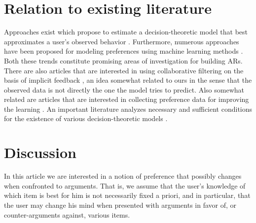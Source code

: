 \documentclass[french, english]{da2pl2018}
\begin{document}

\section{Relation to existing literature}
\label{sec:litt}
Approaches exist which propose to estimate a decision-theoretic model that best approximates a user’s observed behavior \citep{greco_trends_2010, sobrie_learning_2018}. 
Furthermore, numerous approaches have been proposed for modeling preferences using machine learning methods \citep{furnkranz_preference_2010}. Both these trends constitute promising areas of investigation for building \acp{AR}.
There are also articles that are interested in using collaborative filtering on the basis of implicit feedback \citep{rendle_bpr:_2009, hu_collaborative_2008}, an idea somewhat related to ours in the sense that the observed data is not directly the one the model tries to predict.
Also somewhat related are articles that are interested in collecting preference data for improving the learning \citep{sepliarskaia_preference_2018}.
An important literature analyzes necessary and sufficient conditions for the existence of various decision-theoretic models \citep{krantz_foundations_1971, gonzales_additive_1996, bouyssou_consolidated_2015}.



\appendix
\section{Discussion}
\label{sec:disc}
In this article we are interested in a notion of preference that possibly changes when confronted to arguments. That is, we assume that the user’s knowledge of which item is best for him is not necessarily fixed a priori, and in particular, that the user may change his mind when presented with arguments in favor of, or counter-arguments against, various items. 
\end{document}
